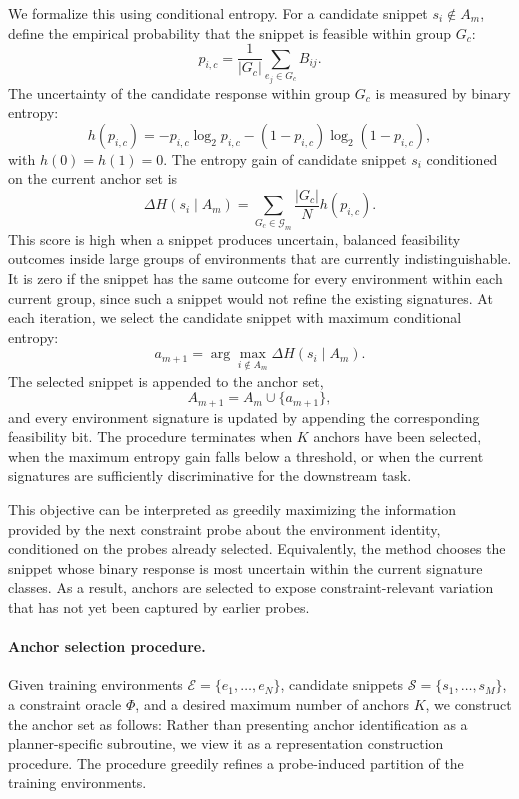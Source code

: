 We formalize this using conditional entropy. For a candidate snippet $s_i\notin A_m$, define the empirical probability that the snippet is feasible within group $G_c$:
%
\begin{equation}
    p_{i,c}
    =
    \frac{1}{|G_c|}
    \sum_{e_j\in G_c} B_{ij}.
\end{equation}
%
The uncertainty of the candidate response within group $G_c$ is measured by binary entropy:
%
\begin{equation}
    h(p_{i,c})
    =
    -p_{i,c}\log_2 p_{i,c}
    -(1-p_{i,c})\log_2(1-p_{i,c}),
\end{equation}
%
with $h(0)=h(1)=0$. The entropy gain of candidate snippet $s_i$ conditioned on the current anchor set is
%
\begin{equation}
    \Delta H(s_i\mid A_m)
    =
    \sum_{G_c\in\mathcal{G}_m}
    \frac{|G_c|}{N}
    h(p_{i,c}).
\end{equation}
%
This score is high when a snippet produces uncertain, balanced feasibility outcomes inside large groups of environments that are currently indistinguishable. It is zero if the snippet has the same outcome for every environment within each current group, since such a snippet would not refine the existing signatures. At each iteration, we select the candidate snippet with maximum conditional entropy:
%
\begin{equation}
    a_{m+1}
    =
    \arg\max_{i\notin A_m}
    \Delta H(s_i\mid A_m).
\end{equation}
%
The selected snippet is appended to the anchor set,
%
\begin{equation}
    A_{m+1}=A_m\cup\{a_{m+1}\},
\end{equation}
%
and every environment signature is updated by appending the corresponding feasibility bit. The procedure terminates when $K$ anchors have been selected, when the maximum entropy gain falls below a threshold, or when the current signatures are sufficiently discriminative for the downstream task.

This objective can be interpreted as greedily maximizing the information provided by the next constraint probe about the environment identity, conditioned on the probes already selected. Equivalently, the method chooses the snippet whose binary response is most uncertain within the current signature classes. As a result, anchors are selected to expose constraint-relevant variation that has not yet been captured by earlier probes.

\paragraph{Anchor selection procedure.}
Given training environments $\mathcal{E}=\{e_1,\ldots,e_N\}$, candidate snippets $\mathcal{S}=\{s_1,\ldots,s_M\}$, a constraint oracle $\Phi$, and a desired maximum number of anchors $K$, we construct the anchor set as follows:
Rather than presenting anchor identification as a planner-specific subroutine, we view it as a representation construction procedure. The procedure greedily refines a probe-induced partition of the training environments.

